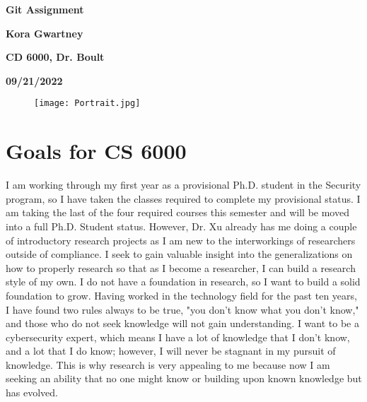 \documentclass[fleqn,10pt]{olplainarticle}
\begin{document}
\begin{center}
    \Large
    \textbf{Git Assignment}  
        
    \vspace{0.4cm}
    \textbf{Kora Gwartney}

    \vspace{0.4cm}
    \textbf{CD 6000, Dr. Boult}
    
     \vspace{0.4cm}
    \textbf{09/21/2022}
\end{center}

\begin{figure}[ht]
\centering
\texttt{[image: Portrait.jpg]}
\label{fig:view}
\end{figure}
\bigskip

\section*{Goals for CS 6000 }
I am working through my first year as a provisional Ph.D. student in the Security program, so I have taken the classes required to complete my provisional status. I am taking the last of the four required courses this semester and will be moved into a full Ph.D. Student status. However, Dr. Xu already has me doing a couple of introductory research projects as I am new to the interworkings of researchers outside of compliance. I seek to gain valuable insight into the generalizations on how to properly research so that as I become a researcher, I can build a research style of my own. I do not have a foundation in research, so I want to build a solid foundation to grow. Having worked in the technology field for the past ten years, I have found two rules always to be true, "you don't know what you don't know," and those who do not seek knowledge will not gain understanding. I want to be a cybersecurity expert, which means I have a lot of knowledge that I don't know, and a lot that I do know; however, I will never be stagnant in my pursuit of knowledge. This is why research is very appealing to me because now I am seeking an ability that no one might know or building upon known knowledge but has evolved.  
\end{document}
